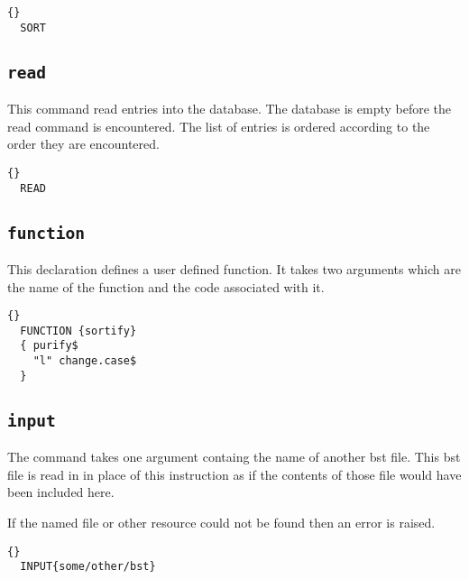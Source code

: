 \begin{lstlisting}{}
  SORT
\end{lstlisting}


\subsection{\texttt{read}}

This command read entries into the database. The database is empty
before the read command is encountered. The list of entries is ordered
according to the order they are encountered.

\begin{lstlisting}{}
  READ
\end{lstlisting}


\subsection{\texttt{function}}

This declaration defines a user defined function. It takes two
arguments which are the name of the function and the code associated
with it.

\INCOMPLETE

\begin{lstlisting}{}
  FUNCTION {sortify}
  { purify$
    "l" change.case$
  }
\end{lstlisting}


\subsection{\texttt{input}}

The command takes one argument containg the name of another bst file.
This bst file is read in in place of this instruction as if the
contents of those file would have been included here. 

If the named file or other resource could not be found then an error
is raised.

\begin{lstlisting}{}
  INPUT{some/other/bst}
\end{lstlisting}


